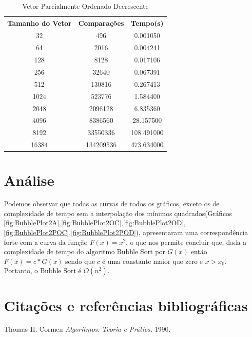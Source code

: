 \documentclass[12pt,a4paper,twoside]{report}
\begin{document}
\begin{table}[h]
  \centering
  \caption{Vetor Parcialmente Ordenado Decrescente \label{tab:pod}}
  \begin{tabular}{ccc} \\\hline
  \textbf{Tamanho do Vetor} & \textbf{Comparações} & \textbf{Tempo(s)} \\\hline
  32                        & 496                  & 0.001050          \\\hline
  64                        & 2016                 & 0.004241          \\\hline
  128                       & 8128                 & 0.017106          \\\hline
  256                       & 32640                & 0.067391          \\\hline
  512                       & 130816               & 0.267413          \\\hline
  1024                      & 523776               & 1.584400          \\\hline
  2048                      & 2096128              & 6.835360          \\\hline
  4096                      & 8386560              & 28.157500         \\\hline
  8192                      & 33550336             & 108.491000        \\\hline
  16384                     & 134209536            & 473.634000        \\\hline
  \end{tabular}
\end{table}


\chapter{Análise}

Podemos observar que todas as curvas de todos os gráficos, exceto os de complexidade de tempo sem a interpolação dos mínimos quadrados(Gráficos \ref{fig:BubblePlot2A},\ref{fig:BubblePlot2OC},\ref{fig:BubblePlot2OD},\ref{fig:BubblePlot2POC},\ref{fig:BubblePlot2POD}), apresentaram uma correspondência forte com a curva da função $F(x) = x^2$, o que nos permite concluir que, dada a complexidade de tempo do algoritmo Bubble Sort por $G(x)$ então $F(x) = c * G(x)$ sendo que $c$ é uma constante maior que zero e $x > x_0$. Portanto, o Bubble Sort é $O(n^2)$.

\chapter{Citações e referências bibliográficas}
	\begin{thebibliography}{1}
	
		 Thomas H. Cormen {\em 
		Algoritmos: Teoria e Prática.
		}  1990.
	
	\end{thebibliography}
\end{document}
